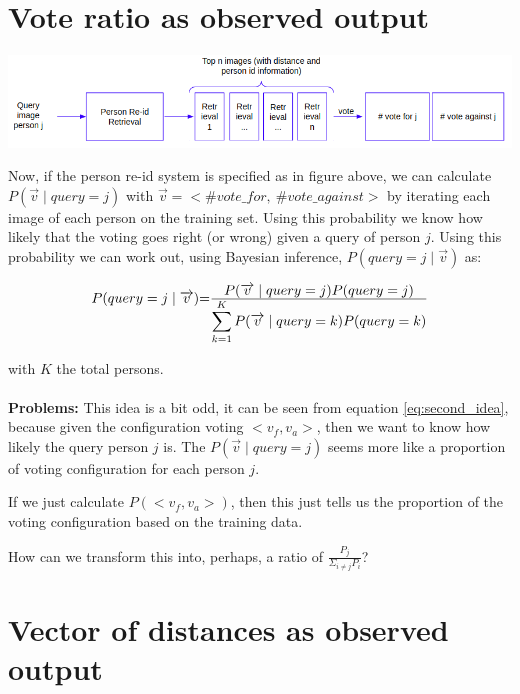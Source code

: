 \documentclass[10pt,a4paper,final]{article}
\begin{document}
\section{Vote ratio as observed output}

\includegraphics[width=\textwidth]{figures/second_idea.png}

Now, if the person re-id system is specified as in figure above, we can calculate $P(\overrightarrow{v} \mid query = j)$ with $\overrightarrow{v} = <\#vote\_for, ~\#vote\_against>$ by iterating each image of each person on the training set. Using this probability we know how likely that the voting goes right (or wrong) given a query of person $j$. Using this probability we can work out, using Bayesian inference, $P(query=j \mid \overrightarrow{v})$ as:

\begin{equation}
	\label{eq:second_idea}
	\begin{tabular}{r@{=}l}
		$P(query=j \mid \overrightarrow{v})$ & $\frac{\displaystyle P(\overrightarrow{v} \mid query = j) P(query=j)}{\displaystyle\sum_{k=1}^{K} P(\overrightarrow{v} \mid query = k) P(query=k)}$ \\ 
	\end{tabular}
\end{equation}

\noindent with $K$ the total persons.
\\
\\
\noindent \textbf{Problems:}
This idea is a bit odd, it can be seen from equation \ref{eq:second_idea}, because given the configuration voting $<v_f, v_a>$, then we want to know how likely the query person $j$ is. The $P(\overrightarrow{v} \mid query = j)$ seems more like a proportion of voting configuration for each person $j$.

If we just calculate $P(<v_f, v_a>)$, then this just tells us the proportion of the voting configuration based on the training data.

How can we transform this into, perhaps, a ratio of $\displaystyle\frac{P_j}{\Sigma_{i \neq j} P_i}$? 

\section{Vector of distances as observed output}
\end{document}
